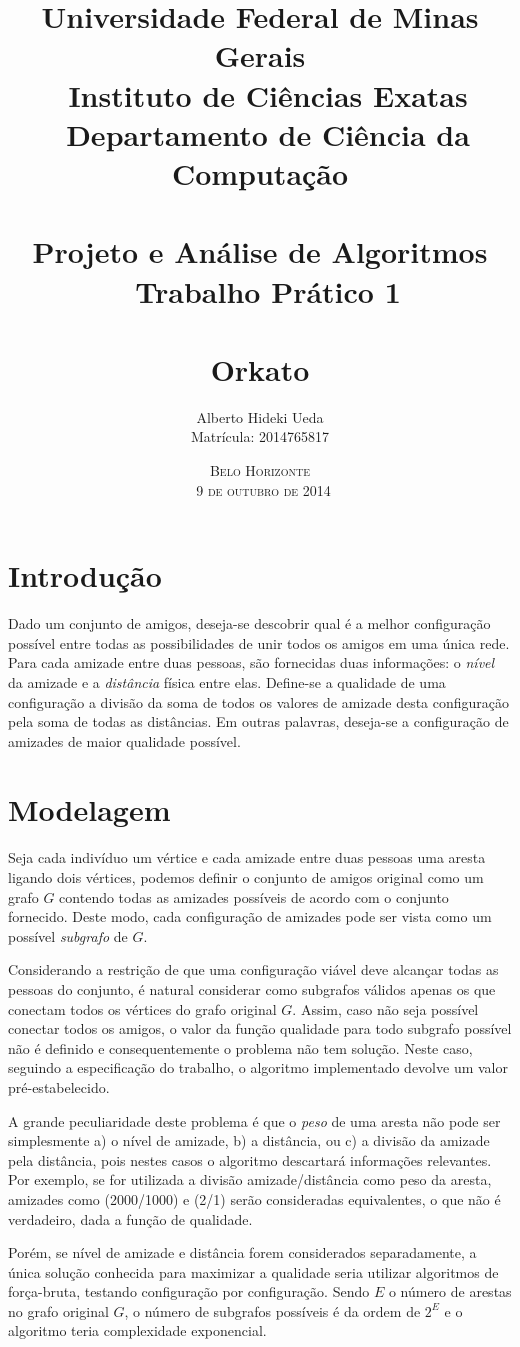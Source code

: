 \documentclass[a4paper,12pt,titlepage]{article}
\title{\large
Universidade Federal de Minas Gerais \\ \
Instituto de Ciências Exatas \\ \ 
Departamento de Ciência da Computação \\ \
\\[1cm]
Projeto e Análise de Algoritmos\\ \
Trabalho Prático 1\\ \
\\[1cm]
\textbf{\Large Orkato}
\\[1cm]
}
\author{\large Alberto Hideki Ueda \\[0.5cm] 
Matrícula: 2014765817
\\[3cm] }
\date{\textsc{Belo Horizonte\\ \
9 de outubro de 2014}}
\begin{document}
\maketitle

\pagebreak

\section{Introdução}
Dado um conjunto de amigos, deseja-se descobrir qual é a melhor configuração possível entre todas as possibilidades de unir todos os amigos em uma única rede. Para cada amizade entre duas pessoas, são fornecidas duas informações: o \textit{nível} da amizade e a \textit{distância} física entre elas. Define-se a qualidade de uma configuração a divisão da soma de todos os valores de amizade desta configuração pela soma de todas as distâncias. Em outras palavras, deseja-se a configuração de amizades de maior qualidade possível.

\section{Modelagem}
Seja cada indivíduo um vértice e cada amizade entre duas pessoas uma aresta ligando dois vértices, podemos definir o conjunto de amigos original como um grafo $G$ contendo todas as amizades possíveis de acordo com o conjunto fornecido. Deste modo, cada configuração de amizades pode ser vista como um possível \textit{subgrafo} de $G$. 

Considerando a restrição de que uma configuração viável deve alcançar todas as pessoas do conjunto, é natural considerar como subgrafos válidos apenas os que conectam todos os vértices do grafo original $G$. Assim, caso não seja possível conectar todos os amigos, o valor da função qualidade para todo subgrafo possível não é definido e consequentemente o problema não tem solução. Neste caso, seguindo a especificação do trabalho, o algoritmo implementado devolve um valor pré-estabelecido.

A grande peculiaridade deste problema é que o \textit{peso} de uma aresta não pode ser simplesmente a) o nível de amizade, b) a distância, ou c) a divisão da amizade pela distância, pois nestes casos o algoritmo descartará informações relevantes. Por exemplo, se for utilizada a divisão amizade/distância como peso da aresta, amizades como (2000/1000) e (2/1) serão consideradas equivalentes, o que não é verdadeiro, dada a função de qualidade.

Porém, se nível de amizade e distância forem considerados separadamente, a única solução conhecida para maximizar a qualidade seria utilizar algoritmos de força-bruta, testando configuração por configuração. Sendo $E$ o número de arestas no grafo original $G$, o número de subgrafos possíveis é da ordem de $2^E$ e o algoritmo teria complexidade exponencial. 
\end{document}
